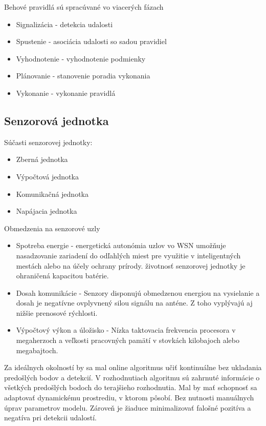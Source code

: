 Behové pravidlá sú spracúvané vo viacerých fázach
\begin{itemize}
\item Signalizácia - detekcia udalosti
\item Spustenie - asociácia udalosti so sadou pravidiel
\item Vyhodnotenie - vyhodnotenie podmienky
\item Plánovanie - stanovenie poradia vykonania
\item Vykonanie - vykonanie pravidlá
\end{itemize}
\cite{processing-information-flows}

\subsection{Senzorová jednotka}

Súčasti senzorovej jednotky:
\begin{itemize}
\item Zberná jednotka
\item Výpočtová jednotka
\item Komunikačná jednotka
\item Napájacia jednotka
\end{itemize}

Obmedzenia na senzorové uzly 
\begin{itemize}
\item Spotreba energie - energetická autonómia uzlov vo WSN umožňuje nasadzovanie zariadení do odľahlých miest pre využitie v inteligentných mestách alebo na účely ochrany prírody. životnosť senzorovej jednotky je ohraničená kapacitou batérie.
\item Dosah komunikácie - Senzory disponujú obmedzenou energiou na vysielanie a dosah je negatívne ovplyvnený silou signálu na anténe. Z toho vyplývajú aj nižšie prenosové rýchlosti.
\item Výpočtový výkon a úložisko - Nízka taktovacia frekvencia procesora v megaherzoch a veľkosti pracovných pamätí v stovkách kilobajoch alebo megabajtoch.
\end{itemize}
\cite{big-data-collection-wsn}


Za ideálnych okolností by sa mal online algoritmus učiť kontinuálne bez ukladania predošlých bodov a detekcií.
V rozhodnutiach algoritmu sú zahrnuté informácie o všetkých predošlých bodoch do terajšieho rozhodnutia. Mal by mať schopnosť sa adaptovať dynamickému prostrediu, v ktorom pôsobí. Bez nutnosti manuálnych úprav parametrov modelu. Zároveň je žiaduce minimalizovať falošné pozitíva a negatíva pri detekcii udalostí.


